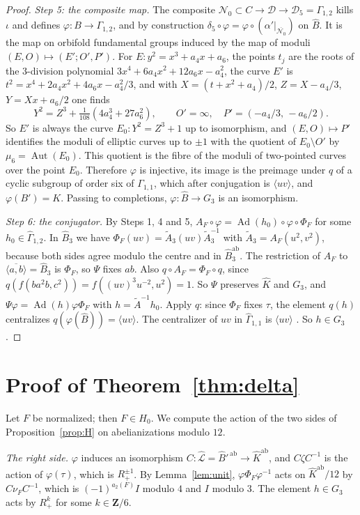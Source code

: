 \documentclass[11pt,a4paper]{article}
\theoremstyle{plain}
\theoremstyle{definition}
\theoremstyle{remark}
\newcommand{\Z}{\mathbf Z}
\newcommand{\Bh}{\widehat B}
\newcommand{\Gh}{\widehat\Gamma}
\newcommand{\Ad}{\operatorname{Ad}}
\newcommand{\Aut}{\operatorname{Aut}}
\newcommand{\ab}{\mathrm{ab}}
\begin{document}
\begin{proof}
\emph{Step 5: the composite map.} The composite
$\mathcal N_0\subset C\to\mathcal D\to\mathcal D_5=\Gamma_{1,2}$ kills $\iota$ and defines $\varphi:B\to\Gamma_{1,2}$,
and by construction $\delta_5\circ\varphi=\varphi\circ(\alpha'|_{\overline{\mathcal N_0}})$ on $\Bh$. It is the map
on orbifold fundamental groups induced by the map of moduli $(E,O)\mapsto(E';O',P')$. For
$E:y^2=x^3+a_4x+a_6$, the points $t_j$ are the roots of the $3$-division polynomial
$3x^4+6a_4x^2+12a_6x-a_4^2$, the curve $E'$ is $t^2=x^4+2a_4x^2+4a_6x-a_4^2/3$, and with
$X=(t+x^2+a_4)/2$, $Z=X-a_4/3$, $Y=Xx+a_6/2$ one finds
\[
 Y^2=Z^3+\tfrac1{108}(4a_4^3+27a_6^2),\qquad O'=\infty,\quad P'=(-a_4/3,\,-a_6/2).
\]
So $E'$ is always the curve $E_0:Y^2=Z^3+1$ up to isomorphism, and $(E,O)\mapsto P'$ identifies the moduli of
elliptic curves up to $\pm1$ with the quotient of $E_0\setminus O'$ by $\mu_6=\Aut(E_0)$. This quotient is the fibre
of the moduli of two-pointed curves over the point $E_0$. Therefore $\varphi$ is injective, its image is the
preimage under $q$ of a cyclic subgroup of order six of $\Gamma_{1,1}$, which after conjugation is
$\langle uv\rangle$, and $\varphi(B')=K$. Passing to completions, $\varphi:\Bh\to G_3$ is an isomorphism.

\emph{Step 6: the conjugator.} By Steps 1, 4 and 5, $A_F\circ\varphi=\Ad(h_0)\circ\varphi\circ\Phi_F$ for some
$h_0\in\Gh_{1,2}$. In $\Bh_3$ we have $\Phi_F(uv)=\tilde A_3(uv)\tilde A_3^{-1}$ with $\tilde A_3=A_F(u^2,v^2)$,
because both sides agree modulo the centre and in $\Bh_3^{\ab}$. The restriction of $A_F$ to
$\overline{\langle a,b\rangle}=\Bh_3$ is $\Phi_F$, so $\Psi$ fixes $ab$. Also $q\circ A_F=\Phi_F\circ q$, since
$q(f(ba^2b,c^2))=f((uv)^3u^{-2},u^2)=1$. So $\Psi$ preserves $\widehat K$ and $G_3$, and
$\Psi\varphi=\Ad(h)\varphi\Phi_F$ with $h=\tilde A^{-1}h_0$. Apply $q$: since $\Phi_F$ fixes $\tau$, the element
$q(h)$ centralizes $q(\varphi(\Bh))=\langle uv\rangle$. The centralizer of $uv$ in $\Gh_{1,1}$ is
$\langle uv\rangle$ \cite{HR}. So $h\in G_3$.
\end{proof}

\section{Proof of Theorem~\ref{thm:delta}}\label{sec:proof}

Let $F$ be normalized; then $F\in H_0$. We compute the action of the two sides of Proposition~\ref{prop:H} on
abelianizations modulo $12$.

\emph{The right side.} $\varphi$ induces an isomorphism $C:\widehat{\mathcal L}=\Bh'^{\,\ab}\to\widehat K^{\ab}$, and
$C\zeta C^{-1}$ is the action of $\varphi(\tau)$, which is $R_+^{\pm1}$. By Lemma~\ref{lem:unit},
$\varphi\Phi_F\varphi^{-1}$ acts on $\widehat K^{\ab}/12$ by $C\nu_FC^{-1}$, which is $(-1)^{a_2(F)}I$ modulo $4$ and
$I$ modulo $3$. The element $h\in G_3$ acts by $R_+^k$ for some $k\in\Z/6$.
\end{document}
